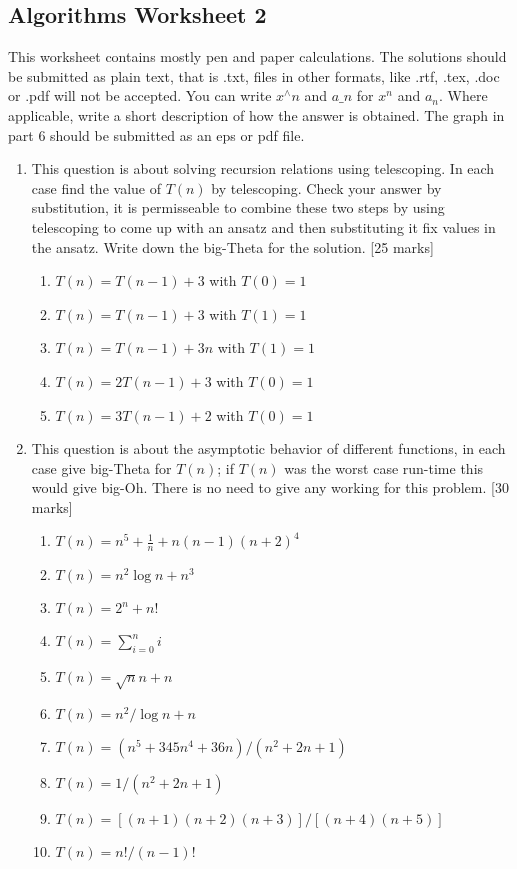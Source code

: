 \documentclass[11pt,a4paper]{scrartcl}
\begin{document}
\subsection*{Algorithms Worksheet 2}

This worksheet contains mostly pen and paper calculations. The
solutions should be submitted as plain text, that is .txt, files in
other formats, like .rtf, .tex, .doc or .pdf will not be accepted. You
can write $x^\wedge n$ and $a\_n$ for $x^n$ and $a_n$. Where
applicable, write a short description of how the answer is
obtained. The graph in part 6 should be submitted as an eps or pdf
file.

\begin{enumerate}

\item This question is about solving recursion relations using
  telescoping. In each case find the value of $T(n)$ by
  telescoping. Check your answer by substitution, it is permisseable
  to combine these two steps by using telescoping to come up with an
  ansatz and then substituting it fix values in the ansatz. Write down
  the big-Theta for the solution. [25 marks] 

\begin{enumerate}
\item $T(n)=T(n-1)+3$ with $T(0)=1$
\item $T(n)=T(n-1)+3$ with $T(1)=1$
\item $T(n)=T(n-1)+3n$ with $T(1)=1$
\item $T(n)=2T(n-1)+3$ with $T(0)=1$
\item $T(n)=3T(n-1)+2$ with $T(0)=1$
\end{enumerate}

\item This question is about the asymptotic behavior of
  different functions, in each case give big-Theta for $T(n)$; if
  $T(n)$ was the worst case run-time this would give big-Oh. There is
  no need to give any working for this problem.  [30 marks]

\begin{enumerate}

\item $T(n)=n^5+\frac{1}{n}+n(n-1)(n+2)^4$
\item $T(n)=n^2\log{n}+n^3$
\item $T(n)=2^n+n!$
\item $T(n)=\sum_{i=0}^ni$
\item $T(n)=\sqrt{n}n+n$
\item $T(n)=n^2/\log{n}+n$
\item $T(n)=(n^5+345n^4+36n)/(n^2+2n+1)$
\item $T(n)=1/(n^2+2n+1)$
\item $T(n)=[(n+1)(n+2)(n+3)]/[(n+4)(n+5)]$
\item $T(n)=n!/(n-1)!$


\end{enumerate}
\end{enumerate}
\end{document}
